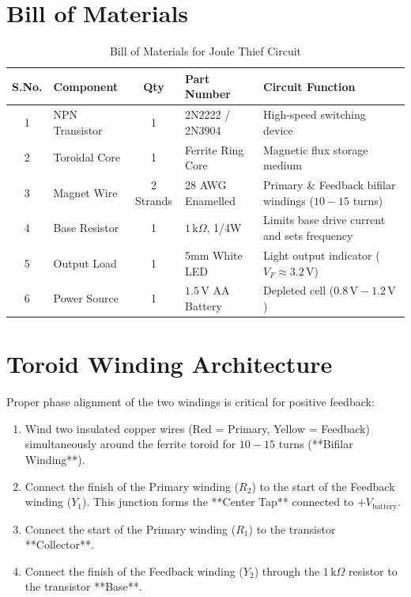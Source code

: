 \documentclass[11pt,a4paper]{article}
\begin{document}
\section{Bill of Materials}
\begin{table}[h!]
\centering
\caption{Bill of Materials for Joule Thief Circuit}
\vspace{0.5em}
\begin{tabular}{@{}c l c l p{6.5cm}@{}}
\toprule
\textbf{S.No.} & \textbf{Component} & \textbf{Qty} & \textbf{Part Number} & \textbf{Circuit Function} \\
\midrule
1 & NPN Transistor & 1 & 2N2222 / 2N3904 & High-speed switching device \\
2 & Toroidal Core & 1 & Ferrite Ring Core & Magnetic flux storage medium \\
3 & Magnet Wire & 2 Strands & 28 AWG Enamelled & Primary \& Feedback bifilar windings ($10-15$ turns) \\
4 & Base Resistor & 1 & $1\,\text{k}\Omega$, 1/4W & Limits base drive current and sets frequency \\
5 & Output Load & 1 & 5mm White LED & Light output indicator ($V_F \approx 3.2\,\text{V}$) \\
6 & Power Source & 1 & $1.5\,\text{V}$ AA Battery & Depleted cell ($0.8\,\text{V} - 1.2\,\text{V}$) \\
\bottomrule
\end{tabular}
\end{table}

\section{Toroid Winding Architecture}
Proper phase alignment of the two windings is critical for positive feedback:
\begin{enumerate}
    \item Wind two insulated copper wires (Red = Primary, Yellow = Feedback) simultaneously around the ferrite toroid for $10-15$ turns (**Bifilar Winding**).
    \item Connect the finish of the Primary winding ($R_2$) to the start of the Feedback winding ($Y_1$). This junction forms the **Center Tap** connected to $+V_{\text{battery}}$.
    \item Connect the start of the Primary winding ($R_1$) to the transistor **Collector**.
    \item Connect the finish of the Feedback winding ($Y_2$) through the $1\,\text{k}\Omega$ resistor to the transistor **Base**.
\end{enumerate}
\end{document}
